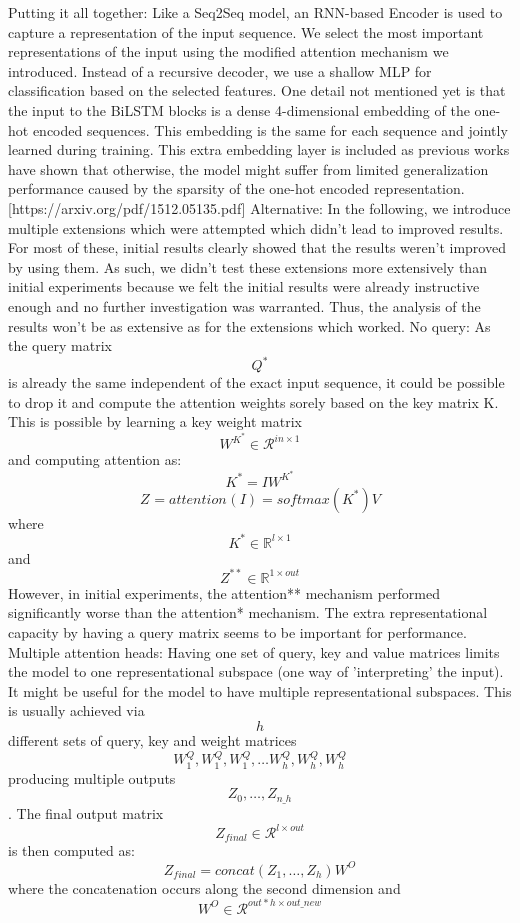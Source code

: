 Putting it all together:
Like a Seq2Seq model, an RNN-based Encoder is used to capture a representation of the input sequence. We select the most important representations of the input using the modified attention mechanism we introduced. Instead of a recursive decoder, we use a shallow MLP for classification based on the selected features.
One detail not mentioned yet is that the input to the BiLSTM blocks is a dense 4-dimensional embedding of the one-hot encoded sequences. This embedding is the same for each sequence and jointly learned during training. This extra embedding layer is included as previous works have shown that otherwise, the model might suffer from limited generalization performance caused by the sparsity of the one-hot encoded representation. [https://arxiv.org/pdf/1512.05135.pdf]
Alternative:
In the following, we introduce multiple extensions which were attempted which didn't lead to improved results. For most of these, initial results clearly showed that the results weren't improved by using them. As such, we didn't test these extensions more extensively than initial experiments because we felt the initial results were already instructive enough and no further investigation was warranted. Thus, the analysis of the results won't be as extensive as for the extensions which worked.
No query:
As the query matrix $${Q}^*$$ is already the same independent of the exact input sequence, it could be possible to drop it and compute the attention weights sorely based on the key matrix K.
This is possible by learning a key weight matrix $$W^{K^*} \in \mathcal{R}^{in \times 1}$$ and computing attention as:
$$K^* = IW^{K^*}$$
$$Z^{} = {attention}^{}(I) = softmax(K^*)V$$
where $$K^* \in \mathbb{R}^{l \times 1}$$ and $$Z^{**} \in \mathbb{R}^{1 \times out}$$
However, in initial experiments, the attention** mechanism performed significantly worse than the attention* mechanism. The extra representational capacity by having a query matrix seems to be important for performance.
Multiple attention heads:
Having one set of query, key and value matrices limits the model to one representational subspace (one way of 'interpreting' the input). It might be useful for the model to have multiple representational subspaces. This is usually achieved via $$h$$ different sets of query, key and weight matrices $$W^Q_1, W^Q_1, W^Q_1, \dots W^Q_{h}, W^Q_{h},W^Q_{h}$$ producing multiple outputs $$Z_0, \dots, Z_{n\_h}$$.
The final output matrix $$Z_{final} \in \mathcal{R}^{l \times out}$$ is then computed as:
$$Z_{final} = concat(Z_1, \dots, Z_{h}) W^O$$
where the concatenation occurs along the second dimension and $$W^O \in \mathcal{R}^{out * h \times out\_new}$$
